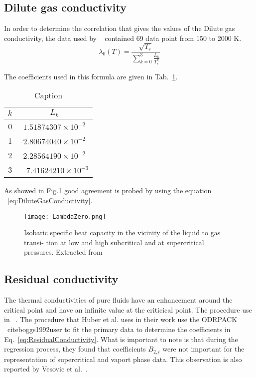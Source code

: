 \subsection{Dilute gas conductivity}

In order to determine the correlation that gives the values of the Dilute gas
conductivity, the data used by ~\cite{huber2016reference} contained 69 data
point from 150 to 2000 K.
\begin{equation}
    \lambda_0(T) = \frac{\sqrt{T_r}}{\sum^3_{k=0}\frac{L_k}{T_r^k}}
	\label{eq:DiluteGasConductivity}
\end{equation}

The coefficients used in this formula are given in
Tab.~\ref{tab:DiluteGasConductivity}.

\begin{table}[h]
    \centering
    \begin{tabular}{c|c}
         $k$ & $L_k$  \\
         \hline
         0  &   $1.51874307\times10^{-2}$\\
         1  &   $2.80674040\times10^{-2}$\\
         2  &   $2.28564190\times10^{-2}$\\
         3  &   $-7.41624210\times10^{-3}$\\
    \end{tabular}
    \caption{Caption}
    \label{tab:DiluteGasConductivity}
\end{table}

As showed in Fig.\ref{fig:DiluteGasConductivity} good agreement is probed by
using the equation ~\ref{eq:DiluteGasConductivity}.

\begin{figure}[h!]
	\centering
	\texttt{[image: LambdaZero.png]}
	\caption{Isobaric specific heat capacity in the vicinity of the liquid
	to gas transi- tion at low and high subcritical and at supercritical
	pressures. Extracted from \cite{huber2016reference}}
\label{fig:DiluteGasConductivity}
\end{figure}

\subsection{Residual conductivity}

The thermal conductivities of pure fluids have an enhancement around the
critical point and have an infinite value at the criticical point. The procedure
use in ~\cite{huber2016reference}. The procedure that Huber et al. uses in their
work use the ODRPACK ~cite{boggs1992user} to fit the primary data to determine
the coefficients in Eq.~\ref{eq:ResidualConductivity}. What is important to note
is that during the regression process, they found that coefficients $B_{2,i}$
were not important for the representation of supercritical and vaport phase data.
This observation is also reported by Vesovic et al.~\cite{vesovic1990transport}.  

